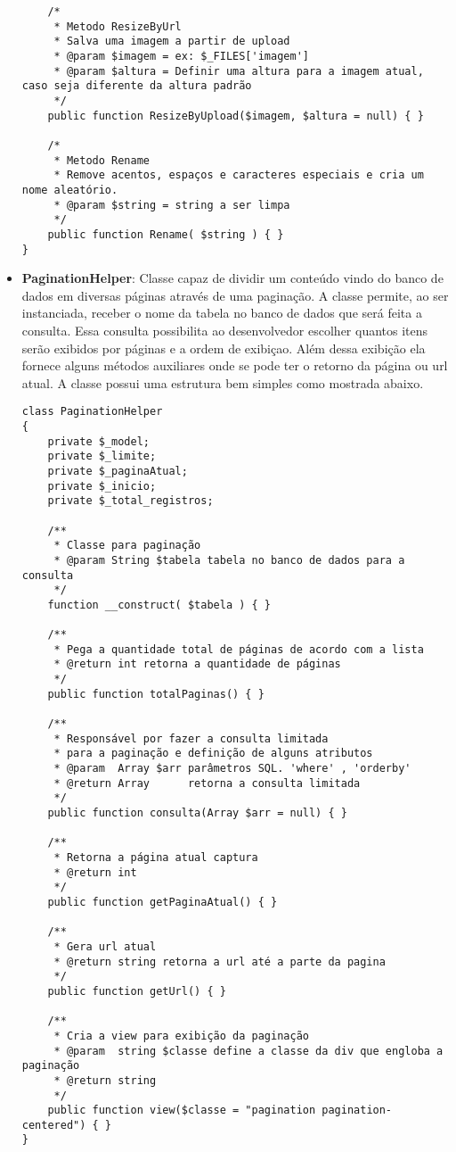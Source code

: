 \begin{itemize}
\begin{lstlisting}
    /*
     * Metodo ResizeByUrl
     * Salva uma imagem a partir de upload
     * @param $imagem = ex: $_FILES['imagem']
     * @param $altura = Definir uma altura para a imagem atual, caso seja diferente da altura padrão
     */
    public function ResizeByUpload($imagem, $altura = null) { }

    /*
     * Metodo Rename
     * Remove acentos, espaços e caracteres especiais e cria um nome aleatório.
     * @param $string = string a ser limpa
     */
    public function Rename( $string ) { }
}
\end{lstlisting}

            \item\textbf{PaginationHelper}: Classe capaz de dividir um conteúdo vindo do banco de dados em diversas páginas através de uma paginação. A classe permite, ao ser instanciada, receber o nome da tabela no banco de dados que será feita a consulta. Essa consulta possibilita ao desenvolvedor escolher quantos itens serão exibidos por páginas e a ordem de exibiçao. Além dessa exibição ela fornece alguns métodos auxiliares onde se pode ter o retorno da página ou url atual. A classe possui uma estrutura bem simples como mostrada abaixo.

\begin{lstlisting}
class PaginationHelper
{
    private $_model;
    private $_limite;
    private $_paginaAtual;
    private $_inicio;
    private $_total_registros;

    /**
     * Classe para paginação
     * @param String $tabela tabela no banco de dados para a consulta
     */
    function __construct( $tabela ) { }

    /**
     * Pega a quantidade total de páginas de acordo com a lista
     * @return int retorna a quantidade de páginas
     */
    public function totalPaginas() { }

    /**
     * Responsável por fazer a consulta limitada
     * para a paginação e definição de alguns atributos
     * @param  Array $arr parâmetros SQL. 'where' , 'orderby'
     * @return Array      retorna a consulta limitada
     */
    public function consulta(Array $arr = null) { }

    /**
     * Retorna a página atual captura
     * @return int
     */
    public function getPaginaAtual() { }

    /**
     * Gera url atual
     * @return string retorna a url até a parte da pagina
     */
    public function getUrl() { }

    /**
     * Cria a view para exibição da paginação
     * @param  string $classe define a classe da div que engloba a paginação
     * @return string
     */
    public function view($classe = "pagination pagination-centered") { }
}
\end{lstlisting}


\end{itemize}
